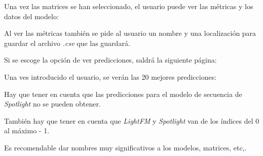 
Una vez las matrices se han seleccionado, el usuario puede ver las métricas y los datos del modelo:


Al ver las métricas también se pide al usuario un nombre y una localización para guardar el archivo \textit{.csv} que las guardará.

Si se escoge la opción de ver predicciones, saldrá la siguiente página:


Una ves introducido el usuario, se verán las 20 mejores predicciones:


Hay que tener en cuenta que las predicciones para el modelo de secuencia de \textit{Spotlight} no se pueden obtener.

También hay que tener en cuenta que \textit{LightFM} y \textit{Spotlight} van de los índices del 0 al máximo - 1.

Es recomendable dar nombres muy significativos a los modelos, matrices, etc,.

